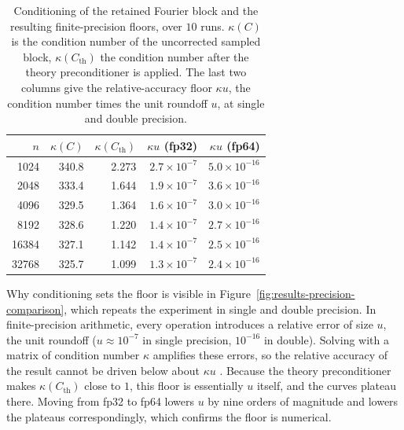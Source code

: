 \begin{table}[!htbp]
	\centering
	\caption{Conditioning of the retained Fourier block and the resulting
		finite-precision floors, over \(10\) runs. \(\kappa(C)\) is the condition
		number of the uncorrected sampled block, \(\kappa(C_{\mathrm{th}})\) the
		condition number after the theory preconditioner is applied.
		The last two columns give the relative-accuracy floor
		\(\kappa u\), the condition number times the unit roundoff \(u\), at single
		and double precision.}
	\label{tab:results-conditioning}
	\begin{tabular}{rrrrr}
		\toprule
		\(n\)               & \(\kappa(C)\)       & \(\kappa(C_{\mathrm{th}})\) &
		\(\kappa u\) (fp32) & \(\kappa u\) (fp64)                                                                              \\
		\midrule
		1024                & 340.8               & 2.273                       & \(2.7\times10^{-7}\) & \(5.0\times10^{-16}\) \\
		2048                & 333.4               & 1.644                       & \(1.9\times10^{-7}\) & \(3.6\times10^{-16}\) \\
		4096                & 329.5               & 1.364                       & \(1.6\times10^{-7}\) & \(3.0\times10^{-16}\) \\
		8192                & 328.6               & 1.220                       & \(1.4\times10^{-7}\) & \(2.7\times10^{-16}\) \\
		16384               & 327.1               & 1.142                       & \(1.4\times10^{-7}\) & \(2.5\times10^{-16}\) \\
		32768               & 325.7               & 1.099                       & \(1.3\times10^{-7}\) & \(2.4\times10^{-16}\) \\
		\bottomrule
	\end{tabular}
\end{table}

Why conditioning sets the floor is visible in
Figure~\ref{fig:results-precision-comparison}, which repeats the experiment in
single and double precision. In finite-precision arithmetic, every operation
introduces a relative error of size \(u\), the unit roundoff (\(u\approx10^{-7}\)
in single precision, \(10^{-16}\) in double). Solving with a matrix of condition
number \(\kappa\) amplifies these errors, so the relative accuracy of the result
cannot be driven below about \(\kappa u\) \citep{trefethen2022numerical}. Because
the theory preconditioner makes \(\kappa(C_{\mathrm{th}})\) close to \(1\), this
floor is essentially \(u\) itself, and the curves plateau there. Moving from fp32
to fp64 lowers \(u\) by nine orders of magnitude and lowers the plateaus
correspondingly, which confirms the floor is numerical.

